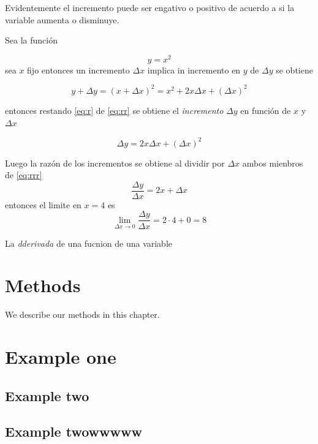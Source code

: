 \documentclass[]{krantz}
\begin{document}
Evidentemente el incremento puede ser engativo o positivo de acuerdo a si la variable aumenta o disminuye.

Sea la función

\begin{equation}
y=x^2
\label{eq:r}
\end{equation}
sea \(x\) fijo entonces un incremento \(\Delta x\) implica in incremento en \(y\) de \(\Delta y\) se obtiene

\begin{equation}
y+\Delta y=(x+\Delta x)^2=x^2+2x\Delta x+(\Delta x)^2
\label{eq:rr}
\end{equation}

entonces restando \eqref{eq:r} de \eqref{eq:rr} se obtiene el \emph{incremento} \(\Delta y\) en función de \(x\) y \(\Delta x\)

\begin{equation}
\Delta y=2x\Delta x+(\Delta x)^2
\label{eq:rrr}
\end{equation}

Luego la razón de los incrementos se obtiene al dividir por \(\Delta x\) ambos mienbros de \eqref{eq:rrr} \[\frac{\Delta y}{\Delta x}=2x+\Delta x\] entonces el limite en \(x=4\) es \[\lim_{\Delta x\to 0}\frac{\Delta y}{\Delta x}=2\cdot 4+0=8\]

La \emph{dderivada} de una fucnion de una variable

\hypertarget{methods}{%
\chapter{Methods}\label{methods}}

We describe our methods in this chapter.

\hypertarget{example-one}{%
\chapter{Example one}\label{example-one}}

\hypertarget{example-two}{%
\section{Example two}\label{example-two}}

\hypertarget{example-twowwwww}{%
\section{Example twowwwww}\label{example-twowwwww}}
\end{document}
